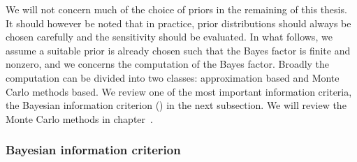 \documentclass[10pt, hyper, bib, fontset=Lucida,
linespread=1.3, typearearatio=0.75]{marticle}
\begin{document}
We will not concern much of the choice of priors in the remaining of this
thesis. It should however be noted that in practice, prior distributions
should always be chosen carefully and the sensitivity should be evaluated. In
what follows, we assume a suitable prior is already chosen such that the Bayes
factor is finite and nonzero, and we concerns the computation of the Bayes
factor. Broadly the computation can be divided into two classes: approximation
based and Monte Carlo methods based. We review one of the most important
information criteria, the Bayesian information criterion (\bic) in the next
subsection. We will review the Monte Carlo methods in chapter~.

\subsubsection{Bayesian information criterion}
\label{ssub:Bayesian information criterion}
\end{document}

